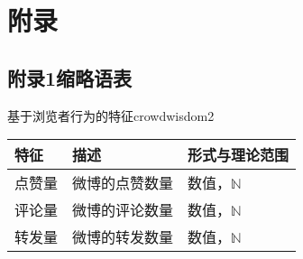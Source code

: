 \setcounter{figure}{0}
\renewcommand{\thefigure}{~附-\arabic{figure}~}
\setcounter{equation}{0}
\renewcommand{\theequation}{~附-\arabic{equation}~}
\setcounter{table}{0}
\renewcommand{\thetable}{~附-\arabic{table}~}
\setcounter{lstlisting}{0}
\makeatletter
\renewcommand \thelstlisting
{附-\@arabic\c@lstlisting}
\makeatother


\chapter*{附\qquad{}录}

\section*{附录1\quad{}缩略语表}

\begin{bupttable}{基于浏览者行为的特征}{crowdwisdom2}
    \begin{tabular}{l|l|l}
        \hline \textbf{特征} & \textbf{描述} & \textbf{形式与理论范围} \\
        \hline 点赞量         & 微博的点赞数量     & 数值，$\mathbb{N}$  \\
        \hline 评论量         & 微博的评论数量     & 数值，$\mathbb{N}$  \\
        \hline 转发量         & 微博的转发数量     & 数值，$\mathbb{N}$  \\
        \hline
    \end{tabular}
\end{bupttable}

